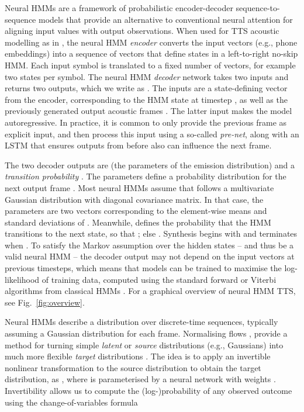 \documentclass[british]{INTERSPEECH2023_arxiv}
\begin{document}
Neural HMMs are a framework of probabilistic encoder-decoder sequence-to-sequence models that provide an alternative to conventional neural attention for aligning input values with output observations.
When used for TTS acoustic modelling as in \cite{yasuda2019initial,mehta2022neural}, the neural HMM \emph{encoder} converts the input vectors (e.g., phone embeddings) into a sequence of vectors  that define  states in a left-to-right no-skip HMM.
Each input symbol is translated to a fixed number of vectors, for example two states per symbol.
The neural HMM \emph{decoder} network takes two inputs and returns two outputs, which we write as .
The inputs are a state-defining vector  from the encoder, corresponding to the HMM state  at timestep , as well as the previously generated output acoustic frames .
The latter input makes the model autoregressive.
In practice, it is common to only provide the previous frame  as explicit input, and then process this input using a so-called \emph{pre-net}, along with an LSTM that ensures outputs from before  also can influence the next frame.

The two decoder outputs are  (the parameters of the emission distribution) and a \emph{transition probability} .
The parameters  define a probability distribution for the next output frame .
Most neural HMMs assume that  follows a multivariate Gaussian distribution with diagonal covariance matrix.
In that case, the parameters  are two vectors corresponding to the element-wise means and standard deviations of .
Meanwhile,  defines the probability that the HMM transitions to the next state, so that ; else .
Synthesis begins with  and terminates when .
To satisfy the Markov assumption over the hidden states  -- and thus be a valid neural HMM -- the decoder output may not depend on the input vectors  at previous timesteps, which means that 
models can be trained to maximise the log-likelihood of training data, computed using the standard forward or Viterbi algorithms from classical HMMs \cite{rabiner1989tutorial}.
For a graphical overview of neural HMM TTS, see Fig.\ \ref{fig:overview}.

Neural HMMs describe a distribution over discrete-time sequences, typically assuming a Gaussian distribution for each frame.
Normalising flows \cite{papamakarios2021normalizing,kobyzev2021normalizing},
provide a method for turning simple \emph{latent} or \emph{source} distributions  (e.g., Gaussians) into much more flexible \emph{target} distributions .
The idea is to apply an invertible nonlinear transformation  to the source distribution to obtain the target distribution, as , where  is parameterised by a neural network with weights .
Invertibility allows us to compute the (log-)probability of any observed outcome 
 using the change-of-variables formula
\end{document}
